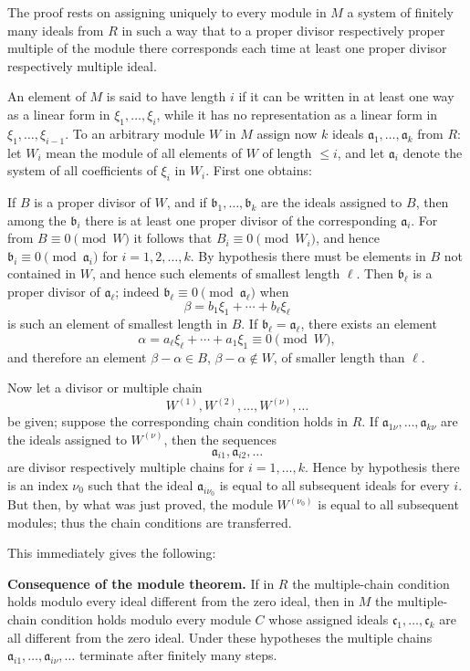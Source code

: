 \documentclass[11pt]{article}
\begin{document}
The proof rests on assigning uniquely to every module in $M$ a system of finitely
many ideals from $R$ in such a way that to a proper divisor respectively proper
multiple of the module there corresponds each time at least one proper divisor
respectively multiple ideal.

An element of $M$ is said to have length $i$ if it can be written in at least one
way as a linear form in $\xi_1,\ldots,\xi_i$, while it has no representation as a
linear form in $\xi_1,\ldots,\xi_{i-1}$. To an arbitrary module $W$ in $M$ assign
now $k$ ideals $\mathfrak a_1,\ldots,\mathfrak a_k$ from $R$: let $W_i$ mean
the module of all elements of $W$ of length $\le i$, and let $\mathfrak a_i$ denote
the system of all coefficients of $\xi_i$ in $W_i$. First one obtains:

If $B$ is a proper divisor of $W$, and if $\mathfrak b_1,\ldots,\mathfrak b_k$ are
the ideals assigned to $B$, then among the $\mathfrak b_i$ there is at least one
proper divisor of the corresponding $\mathfrak a_i$. For from
$B\equiv0\pmod W$ it follows that $B_i\equiv0\pmod {W_i}$, and hence
$\mathfrak b_i\equiv0\pmod{\mathfrak a_i}$ for $i=1,2,\ldots,k$. By hypothesis
there must be elements in $B$ not contained in $W$, and hence such elements of
smallest length $\ell$. Then $\mathfrak b_\ell$ is a proper divisor of
$\mathfrak a_\ell$; indeed
$\mathfrak b_\ell\equiv0\pmod{\mathfrak a_\ell}$ when
\[
        \beta=b_1\xi_1+\cdots+b_\ell\xi_\ell
\]
is such an element of smallest length in $B$. If $\mathfrak b_\ell=\mathfrak a_\ell$,
there exists an element
\[
        \alpha=a_\ell\xi_\ell+\cdots+a_1\xi_1\equiv0\pmod W,
\]
and therefore an element $\beta-\alpha\in B$, $\beta-\alpha\notin W$, of smaller
length than $\ell$.

Now let a divisor or multiple chain
\[
        W^{(1)},W^{(2)},\ldots,W^{(\nu)},\ldots
\]
be given; suppose the corresponding chain condition holds in $R$. If
$\mathfrak a_{1\nu},\ldots,\mathfrak a_{k\nu}$ are the ideals assigned to
$W^{(\nu)}$, then the sequences
\[
        \mathfrak a_{i1},\mathfrak a_{i2},\ldots
\]
are divisor respectively multiple chains for $i=1,\ldots,k$. Hence by hypothesis
there is an index $\nu_0$ such that the ideal $\mathfrak a_{i\nu_0}$ is equal to
all subsequent ideals for every $i$. But then, by what was just proved, the module
$W^{(\nu_0)}$ is equal to all subsequent modules; thus the chain conditions are
transferred.

This immediately gives the following:

\medskip
\noindent\textbf{Consequence of the module theorem.} If in $R$ the multiple-chain
condition holds modulo every ideal different from the zero ideal, then in $M$ the
multiple-chain condition holds modulo every module $C$ whose assigned ideals
$\mathfrak c_1,\ldots,\mathfrak c_k$ are all different from the zero ideal. Under
these hypotheses the multiple chains
$\mathfrak a_{i1},\ldots,\mathfrak a_{i\nu},\ldots$ terminate after finitely many
steps.
\end{document}
